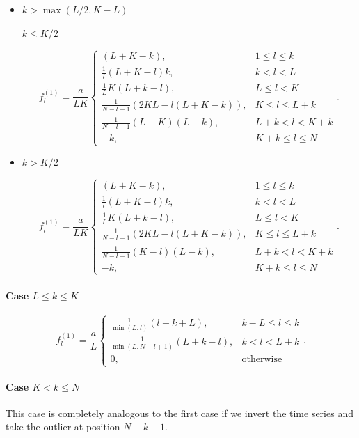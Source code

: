 \documentclass[engproc, submit, article,pdftex,moreauthors]{Definitions/mdpi}
\begin{document}
\begin{itemize}
\item
$k > \max(L / 2, K - L)$

$k \leq K/2$

$$f^{(1)}_l = \frac{a}{{LK}}
\begin{cases}
	(L + K - k), & \text{$1 \leq l \leq k$}\\
	\frac{1}{l}(L + K - l)k, & \text{$k < l < L$}\\
	\frac{1}{L}K(L + k - l), &\text{$L \leq l < K$}\\
	\frac{1}{N - l + 1}(2KL - l(L + K - k)), &\text{$K \leq l \leq L + k$}\\
	\frac{1}{N - l + 1}(L - K)(L - k), &\text{$L + k < l < K + k$}\\
	-k, &\text{$K + k \leq l \leq N$}
\end{cases}.
$$

\item
$k > K/2$


$$f^{(1)}_l = \frac{a}{{LK}}
\begin{cases}
	(L + K - k), & \text{$1 \leq l \leq k$}\\
	\frac{1}{l}(L + K - l)k, & \text{$k < l < L$}\\
	\frac{1}{L}K(L + k - l), &\text{$L \leq l < K$}\\
	\frac{1}{N - l + 1}(2KL - l(L + K - k)), &\text{$K \leq l \leq L + k$}\\
	\frac{1}{N - l + 1}(K - l)(L - k), &\text{$L + k < l < K + k$}\\
	-k, &\text{$K + k \leq l \leq N $}
\end{cases}.
$$
\end{itemize}

\paragraph{Case $L \leq k \leq K$}

$$f^{(1)}_l = \frac{a}{{L}}
\begin{cases}
	\frac{1}{\min(L, l)}(l - k + L), & \text{$k - L \leq l \leq k$}\\
	\frac{1}{\min(L, N - l + 1)}(L + k - l), & \text{$k < l < L + k$}\\
	0, & \text{otherwise}
\end{cases}.$$


\paragraph{Case $K < k \leq N$}
\label{sub:const_noise}
This case is completely analogous to the first case if we invert the time series and take the outlier at position $N - k + 1$.
\end{document}
